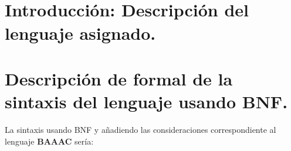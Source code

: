 \documentclass[12pt, spanish]{article}
\makeatletter
\let\thedate\@date
\makeatother
\begin{document}
\begin{titlepage}
\begin{minipage}{0.4\textwidth}
\begin{flushright}
        \end{flushright}
    \end{minipage}\\[0.5cm]

    {\large \thedate}\\[0.5cm]
    {\doclicenseThis}

    \vfill

\end{titlepage}


\tableofcontents
\pagebreak




\section{Introducción: Descripción del lenguaje asignado.}

\section{Descripción de formal de la sintaxis del lenguaje usando BNF.}

\vspace{5 mm}

La sintaxis usando BNF y añadiendo las consideraciones correspondiente al lenguaje \textbf{BAAAC} sería:
\end{document}
